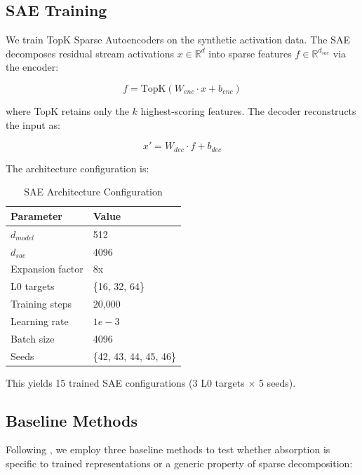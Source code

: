 \documentclass{article}
\begin{document}
\subsection{SAE Training}

We train TopK Sparse Autoencoders on the synthetic activation data. The SAE decomposes residual stream activations $x \in \mathbb{R}^d$ into sparse features $f \in \mathbb{R}^{d_{sae}}$ via the encoder:

\begin{equation}
f = \text{TopK}(W_{enc} \cdot x + b_{enc})
\end{equation}

where TopK retains only the $k$ highest-scoring features. The decoder reconstructs the input as:

\begin{equation}
x' = W_{dec} \cdot f + b_{dec}
\end{equation}

The architecture configuration is:

\begin{table}[h]
\caption{SAE Architecture Configuration}
\label{tab:sae_config}
\centering
\begin{tabular}{ll}
\toprule
Parameter & Value \\
\midrule
$d_{model}$ & 512 \\
$d_{sae}$ & 4096 \\
Expansion factor & 8x \\
L0 targets & \{16, 32, 64\} \\
Training steps & 20,000 \\
Learning rate & $1e-3$ \\
Batch size & 4096 \\
Seeds & \{42, 43, 44, 45, 46\} \\
\bottomrule
\end{tabular}
\end{table}

This yields 15 trained SAE configurations (3 L0 targets $\times$ 5 seeds).

\subsection{Baseline Methods}

Following \citet{korznikov2026}, we employ three baseline methods to test whether absorption is specific to trained representations or a generic property of sparse decomposition:
\end{document}
